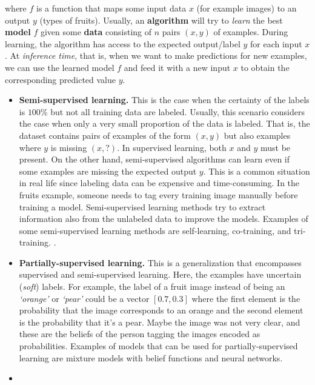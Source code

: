 \documentclass[
  11pt,
]{krantz}
\begin{document}
where \(f\) is a function that maps some input data \(x\) (for example images) to an output \(y\) (types of fruits). Usually, an \textbf{algorithm} will try to \emph{learn} the best \textbf{model} \(f\) given some \textbf{data} consisting of \(n\) pairs \((x,y)\) of examples. During learning, the algorithm has access to the expected output/label \(y\) for each input \(x\). At \emph{inference time}, that is, when we want to make predictions for new examples, we can use the learned model \(f\) and feed it with a new input \(x\) to obtain the corresponding predicted value \(y\).

\begin{itemize}
\item
  \textbf{Semi-supervised learning.} This is the case when the certainty of the labels is \(100\%\) but not all training data are labeled. Usually, this scenario considers the case when only a very small proportion of the data is labeled. That is, the dataset contains pairs of examples of the form \((x,y)\) but also examples where \(y\) is missing \((x,?)\). In supervised learning, both \(x\) and \(y\) must be present. On the other hand, semi-supervised algorithms can learn even if some examples are missing the expected output \(y\). This is a common situation in real life since labeling data can be expensive and time-consuming. In the fruits example, someone needs to tag every training image manually before training a model. Semi-supervised learning methods try to extract information also from the unlabeled data to improve the models. Examples of some semi-supervised learning methods are self-learning, co-training, and tri-training. \citep{trigueroselflabeled}.
\item
  \textbf{Partially-supervised learning.} This is a generalization that encompasses supervised and semi-supervised learning. Here, the examples have uncertain (\emph{soft}) labels. For example, the label of a fruit image instead of being an \emph{`orange'} or \emph{`pear'} could be a vector \([0.7, 0.3]\) where the first element is the probability that the image corresponds to an orange and the second element is the probability that it's a pear. Maybe the image was not very clear, and these are the beliefs of the person tagging the images encoded as probabilities. Examples of models that can be used for partially-supervised learning are mixture models with belief functions \citep{comelearning} and neural networks.
\item

\end{itemize}
\end{document}
